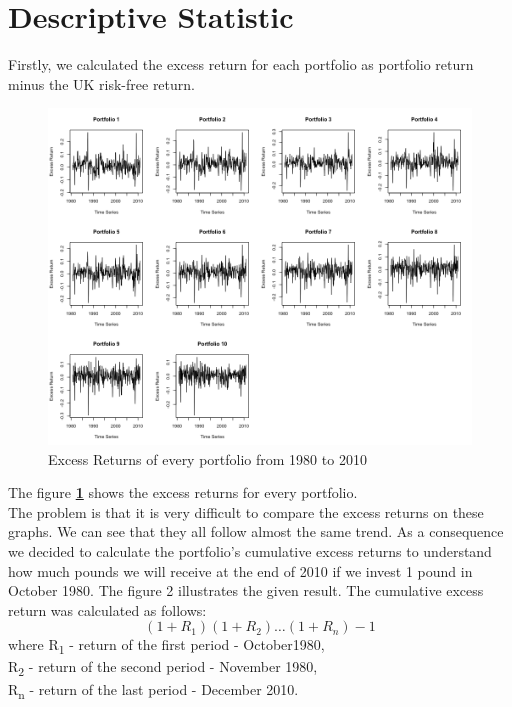 \documentclass[11pt]{article}
\begin{document}

\section{Descriptive Statistic}
Firstly, we calculated the excess return for each portfolio as portfolio return minus the UK risk-free return.
\begin{figure}[H]
    \begin{center}
        \includegraphics[scale = .3]{excess_returns_time.png}
    \end{center}
    \caption{Excess Returns of every portfolio from 1980 to 2010}
    \label{fig:excess_port}
\end{figure}
The figure \textbf{\ref{fig:excess_port}} shows the excess returns for every portfolio.\\
The problem is that it is very difficult to compare the excess returns on these graphs. We can see that they all follow almost the same trend.
As a consequence we decided to calculate the portfolio's cumulative excess returns to understand how much pounds we will receive at the end of 2010 if we invest 1 pound in October 1980. The figure 2 illustrates the given result.
The cumulative excess return was calculated as follows:
\begin{equation}
    (1 + R_1)(1 + R_2)\hdots(1 + R_n) - 1 
    \label{eq:equation_excess}
\end{equation}
where R\textsubscript{1} - return of the first period - October1980,\\
R\textsubscript{2} - return of the second period - November 1980,\\
R\textsubscript{n} - return of the last period - December 2010.
\end{document}
